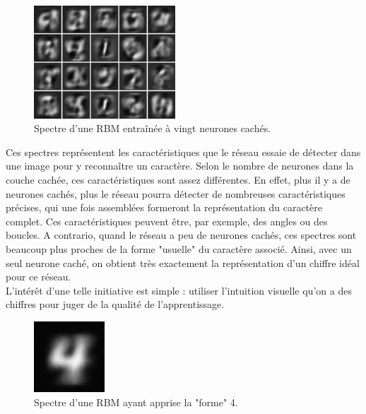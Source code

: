 \documentclass[a4paper,oneside]{report}
\begin{document}
                \begin{figure}
                    \begin{center}
                        \includegraphics[width=150pt]{Images/filters-01.png}
                    \end{center}
                    \caption{Spectre d'une RBM entraînée à vingt neurones cachés.}
                \end{figure}

                Ces spectres représentent les caractéristiques que le réseau essaie de détecter dans une image pour y reconnaître un caractère. Selon le nombre de neurones dans la couche cachée, ces caractéristiques sont assez différentes. En effet, plus il y a de neurones cachés, plus le réseau pourra détecter de nombreuses caractéristiques précises, qui une fois assemblées formeront la représentation du caractère complet. Ces caractéristiques peuvent être, par exemple, des angles ou des boucles. A contrario, quand le réseau a peu de neurones cachés, ces spectres sont beaucoup plus proches de la forme "usuelle" du caractère associé. Ainsi, avec un seul neurone caché, on obtient très exactement la représentation d'un chiffre idéal pour ce réseau.\\

                L'intérêt d'une telle initiative est simple : utiliser l'intuition visuelle qu'on a des chiffres pour juger de la qualité de l'apprentissage.

                \begin{figure}
                    \begin{center}
                        \includegraphics[width=75pt]{Images/spectres-01.png}
                    \end{center}
                    \caption{Spectre d'une RBM ayant apprise la "forme" 4.}
                \end{figure}
\end{document}
